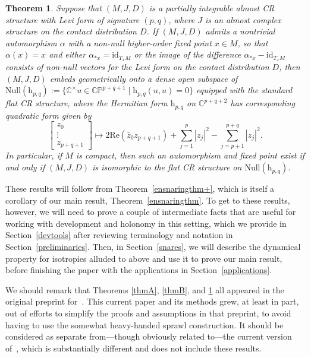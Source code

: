 \documentclass[10pt,a4paper]{amsart}
\numberwithin{equation}{section}
\newtheorem{mainthm}{Theorem}
\theoremstyle{definition}
\begin{document}
\begin{mainthm}\label{thmC} Suppose that $(M,J,D)$ is a partially integrable almost CR structure with Levi form of signature $(p,q)$, where $J$ is an almost complex structure on the contact distribution $D$.
If $(M,J,D)$ admits a nontrivial automorphism $\alpha$ with a non-null higher-order fixed point $x\in M$, so that $\alpha(x)=x$ and either $\alpha_{*x}=\mathrm{id}_{T_xM}$ or the image of the difference $\alpha_{*x}-\mathrm{id}_{T_xM}$ consists of non-null vectors for the Levi form on the contact distribution $D$, then $(M,J,D)$ embeds geometrically onto a dense open subspace of $\mathrm{Null}(\mathrm{h}_{p,q}):=\bigl\{\mathbb{C}^\times u\in\mathbb{CP}^{p+q+1}\mid \mathrm{h}_{p,q}(u,u)=0\bigr\}$ equipped with the standard flat CR structure, where the Hermitian form $\mathrm{h}_{p,q}$ on $\mathbb{C}^{p+q+2}$ has corresponding quadratic form given by \[\begin{bmatrix}z_0 \\ \vdots \\ z_{p+q+1}\end{bmatrix}\mapsto 2\mathrm{Re}(\bar{z}_0z_{p+q+1})+\sum_{j=1}^p|z_j|^2-\sum_{j=p+1}^{p+q}|z_j|^2.\] In particular, if $M$ is compact, then such an automorphism and fixed point exist if and only if $(M,J,D)$ is isomorphic to the flat CR structure on $\mathrm{Null}(\mathrm{h}_{p,q})$.\end{mainthm}

These results will follow from Theorem~\ref{ensnaringthm+}, which is itself a corollary of our main result, Theorem~\ref{ensnaringthm}. To get to these results, however, we will need to prove a couple of intermediate facts that are useful for working with development and holonomy in this setting, which we provide in Section~\ref{devtools} after reviewing terminology and notation in Section~\ref{preliminaries}. Then, in Section~\ref{snares}, we will describe the dynamical property for isotropies alluded to above and use it to prove our main result, before finishing the paper with the applications in Section~\ref{applications}.

We should remark that Theorems \ref{thmA}, \ref{thmB}, and \ref{thmC} all appeared in the original preprint for~\cite{SprawlPaper}. This current paper and its methods grew, at least in part, out of efforts to simplify the proofs and assumptions in that preprint, to avoid having to use the somewhat heavy-handed sprawl construction. It should be considered as separate from---though obviously related to---the current version of~\cite{SprawlPaper}, which is substantially different and does not include these results.
\end{document}
